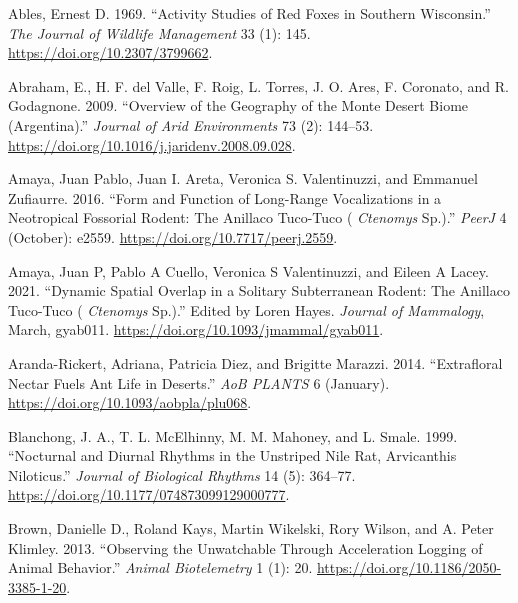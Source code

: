 \documentclass[msc,numbers,hidelinks]{coppe}
\newlength{\cslhangindent}
\newenvironment{cslreferences}%
  {\setlength{\parindent}{0pt}%
  \everypar{\setlength{\hangindent}{\cslhangindent}}\ignorespaces}%
  {\par}
\begin{document}
  \noindent

  \setlength{\parindent}{-0.20in}
  \setlength{\leftskip}{0.20in}
  \setlength{\parskip}{8pt}

  \hypertarget{refs}{}
  \begin{cslreferences}
  \leavevmode\hypertarget{ref-ablesActivityStudiesRed1969}{}%
  Ables, Ernest D. 1969. ``Activity Studies of Red Foxes in Southern Wisconsin.'' \emph{The Journal of Wildlife Management} 33 (1): 145. \url{https://doi.org/10.2307/3799662}.

  \leavevmode\hypertarget{ref-abrahamOverviewGeographyMonte2009}{}%
  Abraham, E., H. F. del Valle, F. Roig, L. Torres, J. O. Ares, F. Coronato, and R. Godagnone. 2009. ``Overview of the Geography of the Monte Desert Biome (Argentina).'' \emph{Journal of Arid Environments} 73 (2): 144--53. \url{https://doi.org/10.1016/j.jaridenv.2008.09.028}.

  \leavevmode\hypertarget{ref-amayaFormFunctionLongrange2016}{}%
  Amaya, Juan Pablo, Juan I. Areta, Veronica S. Valentinuzzi, and Emmanuel Zufiaurre. 2016. ``Form and Function of Long-Range Vocalizations in a Neotropical Fossorial Rodent: The Anillaco Tuco-Tuco ( \emph{Ctenomys} Sp.).'' \emph{PeerJ} 4 (October): e2559. \url{https://doi.org/10.7717/peerj.2559}.

  \leavevmode\hypertarget{ref-amayaDynamicSpatialOverlap2021}{}%
  Amaya, Juan P, Pablo A Cuello, Veronica S Valentinuzzi, and Eileen A Lacey. 2021. ``Dynamic Spatial Overlap in a Solitary Subterranean Rodent: The Anillaco Tuco-Tuco ( \emph{Ctenomys} Sp.).'' Edited by Loren Hayes. \emph{Journal of Mammalogy}, March, gyab011. \url{https://doi.org/10.1093/jmammal/gyab011}.

  \leavevmode\hypertarget{ref-aranda-rickertExtrafloralNectarFuels2014}{}%
  Aranda-Rickert, Adriana, Patricia Diez, and Brigitte Marazzi. 2014. ``Extrafloral Nectar Fuels Ant Life in Deserts.'' \emph{AoB PLANTS} 6 (January). \url{https://doi.org/10.1093/aobpla/plu068}.

  \leavevmode\hypertarget{ref-blanchongNocturnalDiurnalRhythms1999}{}%
  Blanchong, J. A., T. L. McElhinny, M. M. Mahoney, and L. Smale. 1999. ``Nocturnal and Diurnal Rhythms in the Unstriped Nile Rat, Arvicanthis Niloticus.'' \emph{Journal of Biological Rhythms} 14 (5): 364--77. \url{https://doi.org/10.1177/074873099129000777}.

  \leavevmode\hypertarget{ref-brownObservingUnwatchableAcceleration2013}{}%
  Brown, Danielle D., Roland Kays, Martin Wikelski, Rory Wilson, and A. Peter Klimley. 2013. ``Observing the Unwatchable Through Acceleration Logging of Animal Behavior.'' \emph{Animal Biotelemetry} 1 (1): 20. \url{https://doi.org/10.1186/2050-3385-1-20}.


\end{cslreferences}
\end{document}
